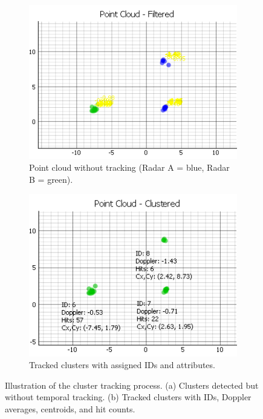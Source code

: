 \begin{figure}[!htbp]
    \centering
    \begin{subfigure}{0.48\linewidth}
        \centering
        \includegraphics[width=\linewidth]{images/TrackClusterPointCloud.png}
        \caption{Point cloud without tracking (Radar A = blue, Radar B = green).}
        \label{fig:track_cluster_pointcloud_a}
    \end{subfigure}
    \hfill
    \begin{subfigure}{0.48\linewidth}
        \centering
        \includegraphics[width=\linewidth]{images/TrackCluster.png}
        \caption{Tracked clusters with assigned IDs and attributes.}
        \label{fig:track_cluster_pointcloud_b}
    \end{subfigure}
    \caption{Illustration of the cluster tracking process.  
    (a) Clusters detected but without temporal tracking.  
    (b) Tracked clusters with IDs, Doppler averages, centroids, and hit counts.}
    \label{fig:track_cluster_pointcloud}
\end{figure}

\vspace{10\baselineskip}
